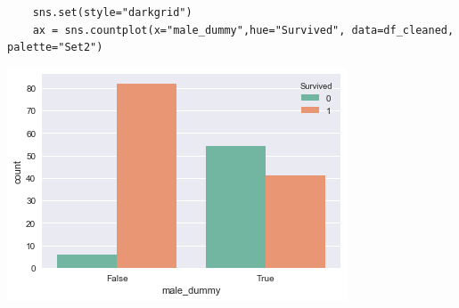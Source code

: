 \documentclass[11pt]{article}
\begin{document}
\begin{verbatim}
    sns.set(style="darkgrid")
    ax = sns.countplot(x="male_dummy",hue="Survived", data=df_cleaned, palette="Set2")
\end{verbatim}

\begin{center}
\includegraphics[width=.9\linewidth]{output_68_0.png}
\end{center}
\end{document}

